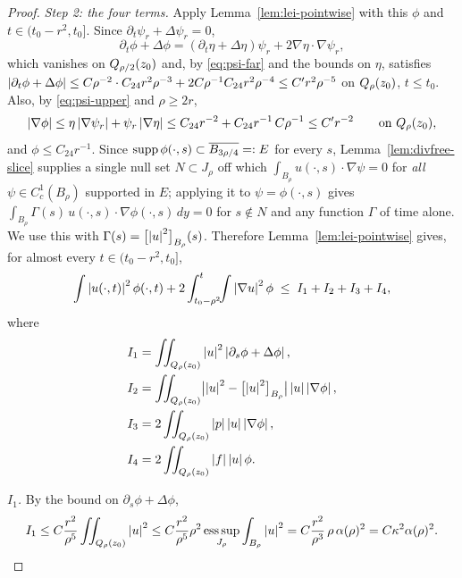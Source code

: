 \documentclass[11pt,reqno]{amsart}
\begin{document}
\begin{proof}
\emph{Step 2: the four terms.} Apply Lemma~\ref{lem:lei-pointwise} with this
$\phi$ and $t\in(t_{0}-r^{2},t_{0}]$. Since
$\partial_{t}\psi_{r}+\Delta\psi_{r}=0$,
\begin{equation}\label{eq:phi-heat}
  \partial_{t}\phi+\Delta\phi
  =(\partial_{t}\eta+\Delta\eta)\psi_{r}+2\nabla\eta\cdot\nabla\psi_{r},
\end{equation}
which vanishes on $Q_{\rho/2}(z_{0})$ and, by \eqref{eq:psi-far} and the
bounds on $\eta$, satisfies
$\left\lvert \partial_{t}\phi+\Delta\phi \right\rvert\le C\rho^{-2}\cdot C_{24}r^{2}\rho^{-3}
 +2C\rho^{-1}C_{24}r^{2}\rho^{-4}\le C'r^{2}\rho^{-5}$ on
$Q_{\rho}(z_{0})$, $t\le t_{0}$. Also, by \eqref{eq:psi-upper} and
$\rho\ge2r$,
\begin{equation}\label{eq:grad-phi}
  \left\lvert \nabla\phi \right\rvert\le\eta\left\lvert \nabla\psi_{r} \right\rvert+\psi_{r}\left\lvert \nabla\eta \right\rvert
  \le C_{24}r^{-2}+C_{24}r^{-1}\,C\rho^{-1}\le C'r^{-2}
  \qquad\text{on }Q_{\rho}(z_{0}) ,
\end{equation}
and $\phi\le C_{24}r^{-1}$. Since $\operatorname{supp}\phi(\cdot,s)\subset\overline{B_{3\rho/4}}=:E$ for every $s$,
Lemma~\ref{lem:divfree-slice} supplies a single null set $N\subset J_{\rho}$ off
which $\int_{B_{\rho}}u(\cdot,s)\cdot\nabla\psi=0$ for \emph{all}
$\psi\in C^{1}_{c}(B_{\rho})$ supported in $E$; applying it to
$\psi=\phi(\cdot,s)$ gives
$\int_{B_{\rho}}\Gamma(s)\,u(\cdot,s)\cdot\nabla\phi(\cdot,s)\,dy=0$ for
$s\notin N$ and any function $\Gamma$ of time alone. We use this with
$\Gamma(s)=\bigl[\left\lvert u \right\rvert^{2}\bigr]_{B_{\rho}}(s)$. Therefore
Lemma~\ref{lem:lei-pointwise} gives, for almost every $t\in(t_{0}-r^{2},t_{0}]$,
\[
  \int\left\lvert u(\cdot,t) \right\rvert^{2}\phi(\cdot,t)
  +2\int_{t_{0}-\rho^{2}}^{t}\!\!\int\left\lvert \nabla u \right\rvert^{2}\phi
  \;\le\;I_{1}+I_{2}+I_{3}+I_{4},
\]
where
\[\begin{aligned}
  &I_{1}=\iint_{Q_{\rho}(z_{0})}\left\lvert u \right\rvert^{2}\left\lvert \partial_{s}\phi+\Delta\phi \right\rvert,
  \\
  &I_{2}=\iint_{Q_{\rho}(z_{0})}
     \bigl|\left\lvert u \right\rvert^{2}-\bigl[\left\lvert u \right\rvert^{2}\bigr]_{B_{\rho}}\bigr|\left\lvert u \right\rvert\left\lvert \nabla\phi \right\rvert,
  \\
  &I_{3}=2\iint_{Q_{\rho}(z_{0})}\left\lvert p \right\rvert\left\lvert u \right\rvert\left\lvert \nabla\phi \right\rvert,
  \\
  &I_{4}=2\iint_{Q_{\rho}(z_{0})}\left\lvert f \right\rvert\left\lvert u \right\rvert\phi .
\end{aligned}\]

\emph{$I_{1}$.} By the bound on $\partial_{s}\phi+\Delta\phi$,
\[
  I_{1}\le C\frac{r^{2}}{\rho^{5}}\iint_{Q_{\rho}(z_{0})}\left\lvert u \right\rvert^{2}
  \le C\frac{r^{2}}{\rho^{5}}\rho^{2}\operatorname*{ess\,sup}_{J_{\rho}}\int_{B_{\rho}}\left\lvert u \right\rvert^{2}
  = C\frac{r^{2}}{\rho^{3}}\,\rho\,\alpha(\rho)^{2}
  = C\kappa^{2}\alpha(\rho)^{2}.
\]


\end{proof}
\end{document}

